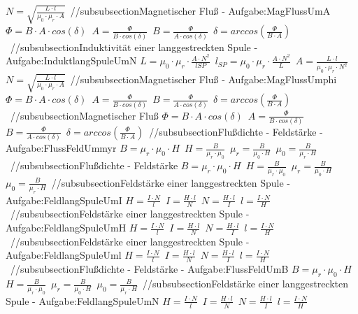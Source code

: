 $ N = \sqrt{\frac{ L\cdot l}{\mu _{0} \cdot \mu _{r} \cdot A}} $\ 
//subsubsection{Magnetischer Fluß - Aufgabe:MagFlussUmA} 
$ \Phi  = B\cdot A\cdot cos(\delta ) $\ 
$ A = \frac{ \Phi }{B\cdot cos(\delta )} $\ 
$ B = \frac{ \Phi }{A\cdot cos(\delta )} $\ 
$ \delta =arccos(\frac{ \Phi }{B\cdot A}) $\ 
//subsubsection{Induktivität einer langgestreckten Spule - Aufgabe:InduktlangSpuleUmN} 
$ L = \mu _{0} \cdot \mu _{r} \cdot \frac{A\cdot N^{2} }{lSP} $\ 
$ l_{SP} = \mu _{0} \cdot \mu _{r} \cdot \frac{A\cdot N^{2} }{L} $\ 
$ A = \frac{ L\cdot l}{\mu _{0} \cdot \mu _{r} \cdot N^{2} } $\ 
$ N = \sqrt{\frac{ L\cdot l}{\mu _{0} \cdot \mu _{r} \cdot A}} $\ 
//subsubsection{Magnetischer Fluß - Aufgabe:MagFlussUmphi} 
$ \Phi  = B\cdot A\cdot cos(\delta ) $\ 
$ A = \frac{ \Phi }{B\cdot cos(\delta )} $\ 
$ B = \frac{ \Phi }{A\cdot cos(\delta )} $\ 
$ \delta =arccos(\frac{ \Phi }{B\cdot A}) $\ 
//subsubsection{Magnetischer Fluß} 
$ \Phi  = B\cdot A\cdot cos(\delta ) $\ 
$ A = \frac{ \Phi }{B\cdot cos(\delta )} $\ 
$ B = \frac{ \Phi }{A\cdot cos(\delta )} $\ 
$ \delta =arccos(\frac{ \Phi }{B\cdot A}) $\ 
//subsubsection{Flußdichte - Feldstärke - Aufgabe:FlussFeldUmmyr} 
$ B = \mu _{r} \cdot \mu _{0} \cdot H $\ 
$ H =\frac{ B}{\mu _{r} \cdot \mu _{0} } $\ 
$ \mu _{r} =\frac{ B}{\mu _{0} \cdot H} $\ 
$ \mu _{0} =\frac{ B}{\mu _{r} \cdot H} $\ 
//subsubsection{Flußdichte - Feldstärke} 
$ B = \mu _{r} \cdot \mu _{0} \cdot H $\ 
$ H =\frac{ B}{\mu _{r} \cdot \mu _{0} } $\ 
$ \mu _{r} =\frac{ B}{\mu _{0} \cdot H} $\ 
$ \mu _{0} =\frac{ B}{\mu _{r} \cdot H} $\ 
//subsubsection{Feldstärke einer langgestreckten Spule - Aufgabe:FeldlangSpuleUmI} 
$ H = \frac{I\cdot N}{ l} $\ 
$ I = \frac{H\cdot l}{ N} $\ 
$ N = \frac{H\cdot l}{ I} $\ 
$ l = \frac{I\cdot N}{ H} $\ 
//subsubsection{Feldstärke einer langgestreckten Spule - Aufgabe:FeldlangSpuleUmH} 
$ H = \frac{I\cdot N}{ l} $\ 
$ I = \frac{H\cdot l}{ N} $\ 
$ N = \frac{H\cdot l}{ I} $\ 
$ l = \frac{I\cdot N}{ H} $\ 
//subsubsection{Feldstärke einer langgestreckten Spule - Aufgabe:FeldlangSpuleUml} 
$ H = \frac{I\cdot N}{ l} $\ 
$ I = \frac{H\cdot l}{ N} $\ 
$ N = \frac{H\cdot l}{ I} $\ 
$ l = \frac{I\cdot N}{ H} $\ 
//subsubsection{Flußdichte - Feldstärke - Aufgabe:FlussFeldUmB} 
$ B = \mu _{r} \cdot \mu _{0} \cdot H $\ 
$ H =\frac{ B}{\mu _{r} \cdot \mu _{0} } $\ 
$ \mu _{r} =\frac{ B}{\mu _{0} \cdot H} $\ 
$ \mu _{0} =\frac{ B}{\mu _{r} \cdot H} $\ 
//subsubsection{Feldstärke einer langgestreckten Spule - Aufgabe:FeldlangSpuleUmN} 
$ H = \frac{I\cdot N}{ l} $\ 
$ I = \frac{H\cdot l}{ N} $\ 
$ N = \frac{H\cdot l}{ I} $\ 
$ l = \frac{I\cdot N}{ H} $\ 
